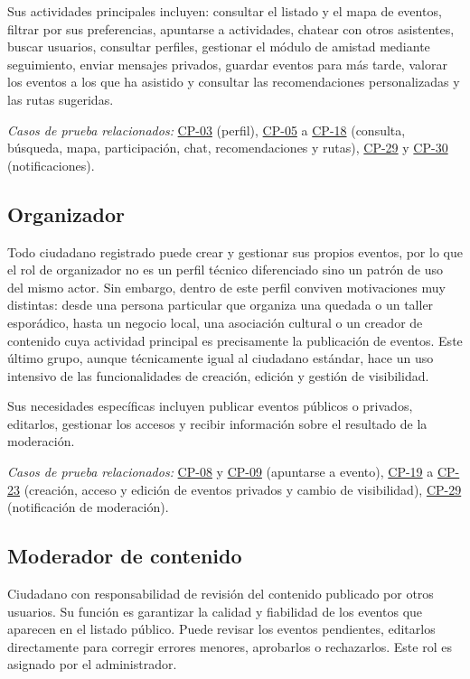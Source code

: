 Sus actividades principales incluyen: consultar el listado y el mapa de eventos, filtrar por sus preferencias, apuntarse a actividades, chatear con otros asistentes, buscar usuarios, consultar perfiles, gestionar el módulo de amistad mediante seguimiento, enviar mensajes privados, guardar eventos para más tarde, valorar los eventos a los que ha asistido y consultar las recomendaciones personalizadas y las rutas sugeridas.

\textit{Casos de prueba relacionados:} \hyperref[cp:03]{CP-03} (perfil), \hyperref[cp:05]{CP-05} a \hyperref[cp:18]{CP-18} (consulta, búsqueda, mapa, participación, chat, recomendaciones y rutas), \hyperref[cp:29]{CP-29} y \hyperref[cp:30]{CP-30} (notificaciones).

\subsection{Organizador}

Todo ciudadano registrado puede crear y gestionar sus propios eventos, por lo que el rol de organizador no es un perfil técnico diferenciado sino un patrón de uso del mismo actor. Sin embargo, dentro de este perfil conviven motivaciones muy distintas: desde una persona particular que organiza una quedada o un taller esporádico, hasta un negocio local, una asociación cultural o un creador de contenido cuya actividad principal es precisamente la publicación de eventos. Este último grupo, aunque técnicamente igual al ciudadano estándar, hace un uso intensivo de las funcionalidades de creación, edición y gestión de visibilidad.

Sus necesidades específicas incluyen publicar eventos públicos o privados, editarlos, gestionar los accesos y recibir información sobre el resultado de la moderación.

\textit{Casos de prueba relacionados:} \hyperref[cp:08]{CP-08} y \hyperref[cp:09]{CP-09} (apuntarse a evento), \hyperref[cp:19]{CP-19} a \hyperref[cp:23]{CP-23} (creación, acceso y edición de eventos privados y cambio de visibilidad), \hyperref[cp:29]{CP-29} (notificación de moderación).

\subsection{Moderador de contenido}

Ciudadano con responsabilidad de revisión del contenido publicado por otros usuarios. Su función es garantizar la calidad y fiabilidad de los eventos que aparecen en el listado público. Puede revisar los eventos pendientes, editarlos directamente para corregir errores menores, aprobarlos o rechazarlos. Este rol es asignado por el administrador.


